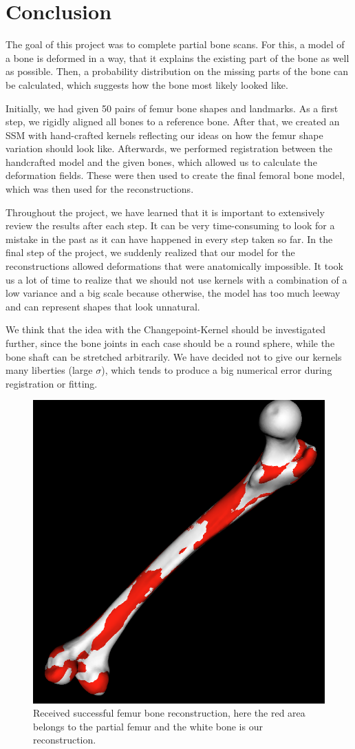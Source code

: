 \documentclass{article} %
\begin{document}
\section{Conclusion}
The goal of this project was to complete partial bone scans. For this, a model of a bone is deformed in a way, that it explains the existing part of the bone as well as possible. Then, a probability distribution on the missing parts of the bone can be calculated, which suggests how the bone most likely looked like.\par
Initially, we had given 50 pairs of femur bone shapes and landmarks. As a first step, we rigidly aligned all bones to a reference bone. After that, we created an SSM with hand-crafted kernels reflecting our ideas on how the femur shape variation should look like. Afterwards, we performed registration between the handcrafted model and the given bones, which allowed us to calculate the deformation fields. These were then used to create the final femoral bone model, which was then used for the reconstructions.\par

Throughout the project, we have learned that it is important to extensively review the results after each step. It can be very time-consuming to look for a mistake in the past as it can have happened in every step taken so far. In the final step of the project, we suddenly realized that our model for the reconstructions allowed deformations that were anatomically impossible. It took us a lot of time to realize that we should not use kernels with a combination of a low variance and a big scale because otherwise, the model has too much leeway and can represent shapes that look unnatural.\par

We think that the idea with the Changepoint-Kernel should be investigated further, since the bone joints in each case should be a round sphere, while the bone shaft can be stretched arbitrarily. We have decided not to give our kernels many liberties (large $\sigma$), which tends to produce a big numerical error during registration or fitting.\par

\begin{figure}[H]
		\centering
		\includegraphics[width=.6\textwidth]{img/newest.png}
		\caption{Received successful femur bone reconstruction, here the red area belongs to the partial femur and the white bone is our reconstruction.}
	\end{figure}
\end{document}
